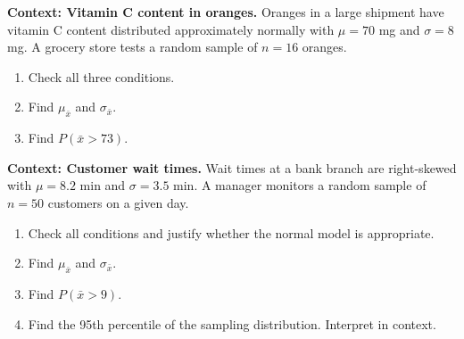 \documentclass[10pt]{article}
\begin{document}
\namepartnerperiod

\vspace{0.1in}

\begin{tcolorbox}[colback=redbg, colframe=black!40, boxrule=0.6pt, arc=2mm,
    left=3mm, right=3mm, top=2mm, bottom=2mm, title=\textbf{Tier R --- Remediate}]
\textbf{Context: Vitamin C content in oranges.}
Oranges in a large shipment have vitamin C content distributed approximately normally
with $\mu = 70$ mg and $\sigma = 8$ mg. A grocery store tests a random sample of
$n = 16$ oranges.

\begin{enumerate}
  \item Check all three conditions.
  \item Find $\mu_{\bar{x}}$ and $\sigma_{\bar{x}}$.
        \vspace{0.5in}
  \item Find $P(\bar{x} > 73)$.
        \vspace{0.8in}
\end{enumerate}
\end{tcolorbox}

\vspace{0.12in}

\begin{tcolorbox}[colback=redbg, colframe=black!40, boxrule=0.6pt, arc=2mm,
    left=3mm, right=3mm, top=2mm, bottom=2mm, title=\textbf{Tier A --- Approaching Proficiency}]
\textbf{Context: Customer wait times.}
Wait times at a bank branch are right-skewed with $\mu = 8.2$ min and $\sigma = 3.5$ min.
A manager monitors a random sample of $n = 50$ customers on a given day.

\begin{enumerate}
  \item Check all conditions and justify whether the normal model is appropriate.
  \item Find $\mu_{\bar{x}}$ and $\sigma_{\bar{x}}$.
        \vspace{0.5in}
  \item Find $P(\bar{x} > 9)$.
        \vspace{0.8in}
  \item Find the 95th percentile of the sampling distribution. Interpret in context.
        \vspace{0.8in}
\end{enumerate}
\end{tcolorbox}
\end{document}
